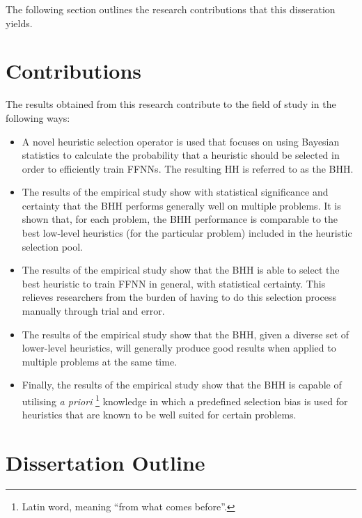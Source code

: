 The following section outlines the research contributions that this disseration yields.


\section{Contributions}\label{sec:introduction:contributions}

The results obtained from this research contribute to the field of study in the
following ways:

\begin{itemize}
      \item A novel heuristic selection operator is used that focuses on using Bayesian statistics to calculate the probability that a heuristic should be selected in order to efficiently train \acp{FFNN}. The resulting \ac{HH} is referred to as the \Acl{BHH}.

      \item The results of the empirical study show with statistical significance and certainty that the \Ac{BHH} performs generally well on multiple problems. It is shown that, for each problem, the \Ac{BHH} performance is comparable to the best low-level heuristics (for the particular problem) included in the heuristic selection pool.

      \item The results of the empirical study show that the \Ac{BHH} is able to select the best heuristic to train \ac{FFNN} in general, with statistical certainty. This relieves researchers from the burden of having to do this selection process manually through trial and error.

      \item The results of the empirical study show that the \Ac{BHH}, given a diverse set of lower-level heuristics, will generally produce good results when applied to multiple problems at the same time.

      \item Finally, the results of the empirical study show that the \Ac{BHH} is capable of utilising \textit{a priori} \footnote{Latin word, meaning ``from what comes before''.} knowledge in which a predefined selection bias is used for heuristics that are known to be well suited for certain problems.
\end{itemize}


\section{Dissertation Outline}\label{sec:introduction:outline}

